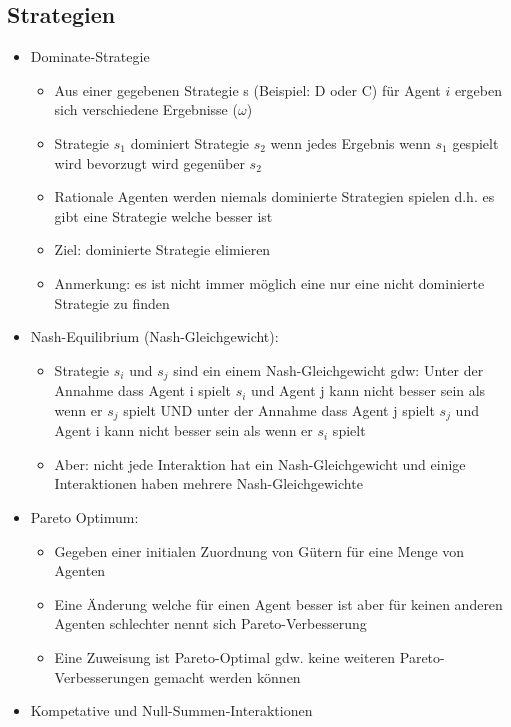 \documentclass{article} %
\begin{document}
	\subsection{Strategien}
	\begin{itemize}
		\item Dominate-Strategie
		\begin{itemize}
			\item Aus einer gegebenen Strategie s (Beispiel: D oder C) für Agent $i$ ergeben sich verschiedene Ergebnisse ($\omega$)
			\item Strategie $s_{1}$ dominiert  Strategie $s_{2}$ wenn jedes Ergebnis wenn $s_{1}$ gespielt wird bevorzugt wird gegenüber $s_{2}$
			\item Rationale Agenten werden niemals dominierte Strategien spielen d.h. es gibt eine Strategie welche besser ist
			\item Ziel: dominierte Strategie elimieren
			\item Anmerkung: es ist nicht immer möglich eine nur eine nicht dominierte Strategie zu finden
		\end{itemize}
		\item Nash-Equilibrium (Nash-Gleichgewicht):
		\begin{itemize}
			\item Strategie $s_i$ und $s_j$ sind ein einem Nash-Gleichgewicht gdw: Unter der Annahme dass Agent i spielt $s_i$ und Agent j kann nicht besser sein als wenn er $s_j$ spielt UND unter der Annahme dass Agent j spielt $s_j$ und Agent i kann nicht besser sein als wenn er $s_i$ spielt
			\item Aber: nicht jede Interaktion hat ein Nash-Gleichgewicht und einige Interaktionen haben mehrere Nash-Gleichgewichte
		\end{itemize}
		\item Pareto Optimum:
		\begin{itemize}
			\item Gegeben einer initialen Zuordnung von Gütern für eine Menge von Agenten
			\item Eine Änderung welche für einen Agent besser ist aber für keinen anderen Agenten schlechter nennt sich Pareto-Verbesserung
			\item Eine Zuweisung ist Pareto-Optimal gdw. keine weiteren Pareto-Verbesserungen gemacht werden können
		\end{itemize}
		\item Kompetative und Null-Summen-Interaktionen
		\begin{itemize}

\end{itemize}
\end{itemize}
\end{document}
